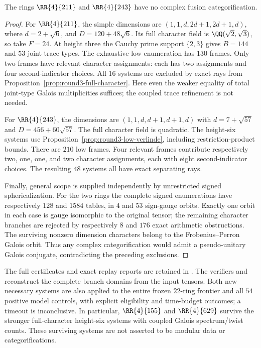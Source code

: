 \begin{theorem}\label{thm:round3-m4-211-243}
The rings $\RR{4}{211}$ and $\RR{4}{243}$ have no complex fusion
categorification.
\end{theorem}
\begin{proof}
For $\RR{4}{211}$, the simple dimensions are
$(1,1,d,2d+1,2d+1,d)$, where $d=2+\sqrt6$, and
$D=120+48\sqrt6$.  Its full character field is
$\QQ(\sqrt2,\sqrt3)$, so take $F=24$.  At height three the Cauchy
prime support $\{2,3\}$ gives $B=144$ and $53$ joint trace types.
The exhaustive low enumeration has $130$ frames.  Only two frames
have relevant character assignments: each has two assignments and
four second-indicator choices.  All $16$ systems are excluded by
exact rays from Proposition~\ref{prop:round3-full-character}.
Here even the weaker equality of total joint-type Galois
multiplicities suffices; the coupled trace refinement is not needed.

For $\RR{4}{243}$, the dimensions are $(1,1,d,d+1,d+1,d)$ with
$d=7+\sqrt{57}$ and $D=456+60\sqrt{57}$.  The full character field is
quadratic.  The height-six systems use
Proposition~\ref{prop:round3-low-verlinde}, including restriction-product
bounds.  There are $210$ low frames.  Four relevant frames contribute
respectively two, one, one, and two character assignments, each with
eight second-indicator choices.  The resulting $48$ systems all have
exact separating rays.

Finally, general scope is supplied independently by unrestricted
signed sphericalization.  For the two rings the complete signed
enumerations have respectively $128$ and $1584$ tables, in $4$ and
$53$ sign-gauge orbits.  Exactly one orbit in each case is gauge
isomorphic to the original tensor; the remaining character branches
are rejected by respectively $8$ and $176$ exact arithmetic
obstructions.  The surviving nonzero dimension characters belong to
the Frobenius--Perron Galois orbit.  Thus any complex categorification would admit a pseudo-unitary
Galois conjugate, contradicting the preceding exclusions.
\end{proof}

The full certificates and exact replay reports are retained in
.  The verifiers
 and
 reconstruct the complete branch
domains from the input tensors.  Both new necessary systems are also
applied to the entire frozen $22$-ring frontier and all $54$ positive
model controls, with explicit eligibility and time-budget outcomes;
a timeout is inconclusive.  In particular, $\RR{4}{155}$ and
$\RR{4}{629}$ survive the stronger full-character height-six systems
with coupled Galois spectrum/twist counts.  These surviving systems
are not asserted to be modular data or categorifications.
